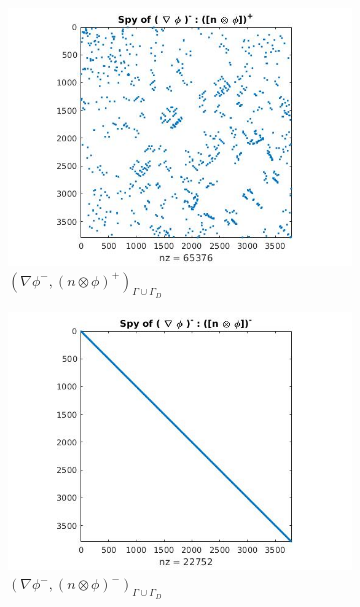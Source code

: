 \documentclass[a4paper,openany]{book}
\begin{document}
\begin{figure}
\begin{subfigure}{0.5\textwidth}
    \includegraphics[width=\linewidth]{figure33.jpg}
  \caption{$( \nabla \phi^- ,(n \otimes \phi)^+)_{\Gamma \cup \Gamma_D}$}
  \label{fig:figure33}
  \end{subfigure}
    \begin{subfigure}{0.5\textwidth}
    \includegraphics[width=\linewidth]{figure34.jpg}
  \caption{$( \nabla \phi^- ,(n \otimes \phi)^-)_{\Gamma \cup \Gamma_D}$}
  \label{fig:figure34}
  \end{subfigure}
  \begin{subfigure}{\textwidth}	
\centering

\end{subfigure}
\end{figure}
\end{document}
